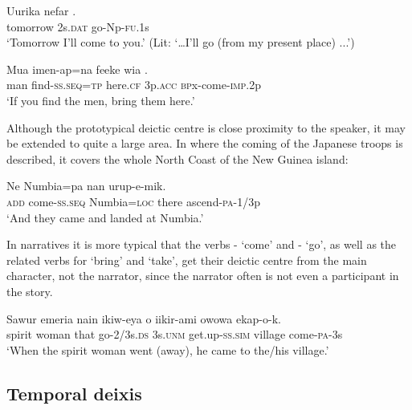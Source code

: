 \ea%
\label{ex:6:x1278}
\gll Uurika  nefar  . \\
tomorrow  2s.\textsc{dat}  go-Np-\textsc{fu}.1s \\
\glt `Tomorrow I'll come to you.' (Lit: `{\dots}I'll go (from my present place) ...')
\z

\ea%
\label{ex:6:x1279}
\gll Mua  imen-ap=na  feeke  wia  . \\
man  find-\textsc{ss}.\textsc{seq}=\textsc{tp}  here.\textsc{cf}  3p.\textsc{acc}  \textsc{bp}x-come-\textsc{imp}.2p\\
\glt `If you find the men, bring them here.'
\z
{}

Although the prototypical deictic centre is close proximity to the speaker, it may be extended to quite a large area. In  where the coming of the Japanese troops is described, it covers the whole North Coast of the New Guinea island: 

\ea%
\label{ex:6:x1892}
\gll Ne    Numbia=pa  nan  urup-e-mik. \\
\textsc{add}  come-\textsc{ss}.\textsc{seq}  Numbia=\textsc{loc}  there  ascend-\textsc{pa}-1/3p\\
\glt `And they came and landed at Numbia.'
\z

In narratives it is more typical that the verbs - `come' and - `go', as well as the related verbs for `bring' and `take', get their deictic centre from the main character, not the narrator, since the narrator often is not even a participant in the story. 

\ea%
\label{ex:6:x1277}
\gll Sawur  emeria  nain  ikiw-eya  o  iikir-ami  owowa ekap-o-k. \\
spirit  woman  that  go-2/3s.\textsc{ds}  3s.\textsc{unm}  get.up-\textsc{ss}.\textsc{sim}  village come-\textsc{pa}-3s\\
\glt `When the spirit woman went (away), he came to the/his village.'
\z

\subsection{Temporal deixis}

